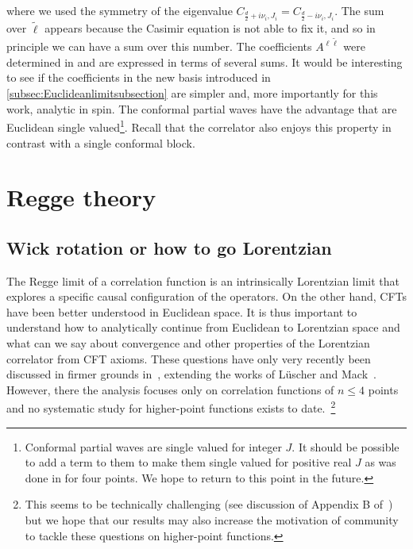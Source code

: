 where we used the symmetry of the eigenvalue $C_{\frac{d}{2}+i\nu_i,J_i} = C_{\frac{d}{2}-i\nu_i,J_i}$. The sum
over $\tilde{\ell}$ appears because the Casimir equation  is not able to fix it, and so in principle we can have a sum over this number.
The coefficients $A^{\ell\tilde{\ell}}$ were determined in \cite{Antunes:2021kmm} and are expressed in terms of several sums. It would be interesting to see if the coefficients in the new basis introduced in \ref{subsec:Euclideanlimitsubsection} are simpler and, more importantly for this work, analytic in spin.
The conformal partial waves have the advantage that are Euclidean single valued\footnote{Conformal partial waves are single valued for integer $J$. It should be possible to add a term to them to make them single valued for positive real $J$ as was done in \cite{Caron-Huot:2020nem} for four points. We hope to return to this point in the future.  }.
Recall that the correlator also enjoys this property in contrast with a single conformal block.

\section{Regge theory}
\label{sec:ReggeTheoryCFT}
\subsection{Wick rotation or how to go Lorentzian}\label{sec:EucToLorent}
The Regge limit of a correlation function is an intrinsically Lorentzian limit that explores a specific causal configuration of the operators.
On the other hand, CFTs have been better understood in Euclidean space.
It is thus important to understand how to analytically continue from Euclidean to Lorentzian space and what can we say about convergence and other properties of the Lorentzian correlator from CFT axioms. These questions have only very recently been discussed in firmer grounds in~\cite{Kravchuk:2020scc,Kravchuk:2021kwe}, extending the works of L\"{u}scher and Mack~\cite{Luscher:1974ez, Mack:1976pa}.
However, there the analysis focuses only on correlation functions of $n\leq 4$ points and no systematic study for higher-point functions exists to date.~\footnote{This seems to be technically challenging (see discussion of Appendix B of~\cite{Kravchuk:2021kwe}) but we hope that our results may also increase the motivation of community to tackle these questions on higher-point functions.}


